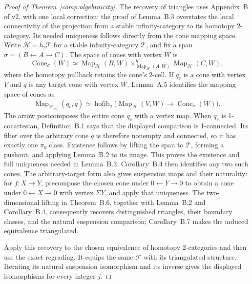 \begin{proof}[Proof of Theorem~\ref{comp:algebraicity}]
The recovery of triangles uses Appendix~B of v2, with one local
correction: the proof of Lemma~B.3 overstates the local connectivity
of the projection from a stable infinity-category to its homotopy
2-category. Its needed uniqueness follows directly from the cone
mapping space. Write $\mathcal H=h_2\mathscr T$ for a stable
infinity-category $\mathscr T$, and fix a span
$\sigma=(B\leftarrow A\to C)$. The space of cones with vertex $W$ is
\[
 \operatorname{Cone}_{\sigma}(W)\simeq
 \operatorname{Map}_{\mathcal H}(B,W)
 \mathop{\times}^{h}_{\operatorname{Map}_{\mathcal H}(A,W)}
 \operatorname{Map}_{\mathcal H}(C,W),
\]
where the homotopy pullback retains the cone's 2-cell. If $q_c$ is a
cone with vertex $V$ and $q$ is any target cone with vertex $W$,
Lemma~A.5 identifies the mapping space of cones as
\[
 \operatorname{Map}_{\mathcal H_{\sigma/}}(q_c,q)
 \simeq\operatorname{hofib}_{q}\bigl(
 \operatorname{Map}_{\mathcal H}(V,W)
 \longrightarrow\operatorname{Cone}_{\sigma}(W)\bigr).
\]
The arrow postcomposes the entire cone $q_c$ with a vertex map.
When $q_c$ is 1-cocartesian, Definition~B.1 says that the displayed
comparison is 1-connected. Its fiber over the arbitrary cone $q$ is
therefore nonempty and connected, so it has exactly one $\pi_0$ class.
Existence follows by lifting the span to $\mathscr T$, forming a
pushout, and applying Lemma~B.2 to its image. This proves the
existence and full uniqueness needed in Lemma~B.3. Corollary~B.4 then
identifies any two such cones. The arbitrary-target form also gives
suspension maps and their naturality: for $f:X\to Y$, precompose the
chosen cone under $0\leftarrow Y\to0$ to obtain a cone under
$0\leftarrow X\to0$ with vertex $\Sigma Y$, and apply that uniqueness.
The two-dimensional lifting in Theorem~B.6, together with
Lemma~B.2 and Corollary~B.4, consequently recovers distinguished triangles,
their boundary classes, and the natural suspension comparison;
Corollary~B.7 makes the induced equivalence triangulated.

Apply this recovery to the chosen equivalence of homotopy
2-categories and then use the exact regrading. It equips the same
$\mathcal F$ with its triangulated structure. Iterating its natural
suspension isomorphism and its inverse gives the displayed
isomorphisms for every integer $j$.
\end{proof}

